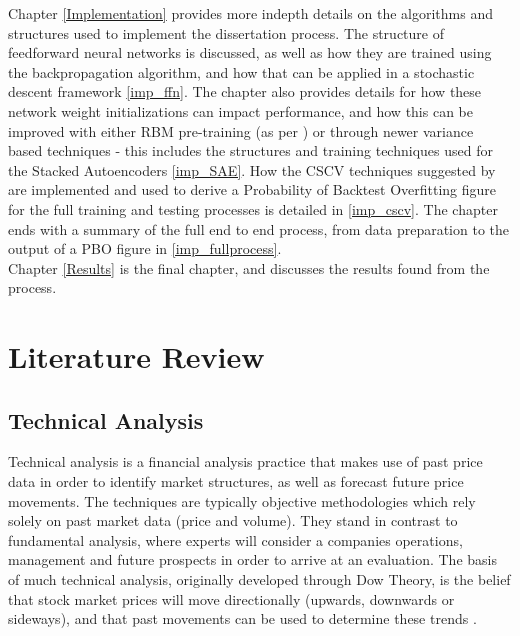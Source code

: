 \documentclass[a4paper,11pt,oneside]{article}
\theoremstyle{plain}
\theoremstyle{definition}
\begin{document}
Chapter \ref{Implementation} provides more indepth details on the algorithms and structures used to implement the dissertation process. The structure of feedforward neural networks is discussed, as well as how they are trained using the backpropagation algorithm, and how that can be applied in a stochastic descent framework \ref{imp_ffn}. The chapter also provides details for how these network weight initializations can impact performance, and how this can be improved with either RBM pre-training (as per \cite{Hinton2}) or through newer variance based techniques  - this includes the structures and training techniques used for the Stacked Autoencoders \ref{imp_SAE}. How the CSCV techniques suggested by \cite{BailyPBO} are implemented and used to derive a Probability of Backtest Overfitting figure for the full training and testing processes is detailed in \ref{imp_cscv}. The chapter ends with a summary of the full end to end process, from data preparation to the output of a PBO figure in \ref{imp_fullprocess}.
~\\\newline
Chapter \ref{Results} is the final chapter, and discusses the results found from the process. 
\newpage
\section{Literature Review}\label{lr_LiteratureReview}
\subsection{Technical Analysis}\label{lr_TechnicalAnalysis}

Technical analysis is a financial analysis practice that makes use of past price data in order to identify market 
structures, as well as forecast future price movements. The techniques are typically objective methodologies 
which rely solely on past market data (price and volume). They stand in contrast to fundamental analysis, where 
experts will consider a companies operations, management and future prospects in order to arrive at an evaluation. 
The basis of much technical analysis, originally developed through Dow Theory, is the belief that stock market 
prices will move directionally (upwards, downwards or sideways), and that past movements can be used to 
determine these trends  \cite {Murphy}.
\hfill \break 
\end{document}
